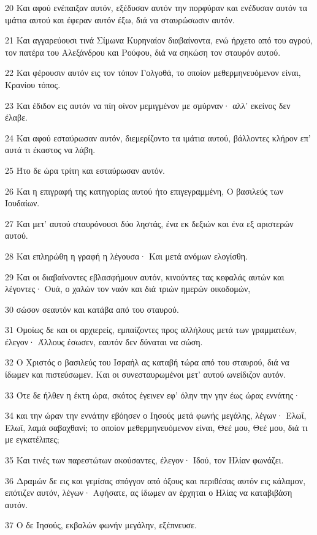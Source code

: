 \par 20 Και αφού ενέπαιξαν αυτόν, εξέδυσαν αυτόν την πορφύραν και ενέδυσαν αυτόν τα ιμάτια αυτού και έφεραν αυτόν έξω, διά να σταυρώσωσιν αυτόν.
\par 21 Και αγγαρεύουσι τινά Σίμωνα Κυρηναίον διαβαίνοντα, ενώ ήρχετο από του αγρού, τον πατέρα του Αλεξάνδρου και Ρούφου, διά να σηκώση τον σταυρόν αυτού.
\par 22 Και φέρουσιν αυτόν εις τον τόπον Γολγοθά, το οποίον μεθερμηνευόμενον είναι, Κρανίου τόπος.
\par 23 Και έδιδον εις αυτόν να πίη οίνον μεμιγμένον με σμύρναν· αλλ' εκείνος δεν έλαβε.
\par 24 Και αφού εσταύρωσαν αυτόν, διεμερίζοντο τα ιμάτια αυτού, βάλλοντες κλήρον επ' αυτά τι έκαστος να λάβη.
\par 25 Ήτο δε ώρα τρίτη και εσταύρωσαν αυτόν.
\par 26 Και η επιγραφή της κατηγορίας αυτού ήτο επιγεγραμμένη, Ο βασιλεύς των Ιουδαίων.
\par 27 Και μετ' αυτού σταυρόνουσι δύο ληστάς, ένα εκ δεξιών και ένα εξ αριστερών αυτού.
\par 28 Και επληρώθη η γραφή η λέγουσα· Και μετά ανόμων ελογίσθη.
\par 29 Και οι διαβαίνοντες εβλασφήμουν αυτόν, κινούντες τας κεφαλάς αυτών και λέγοντες· Ουά, ο χαλών τον ναόν και διά τριών ημερών οικοδομών,
\par 30 σώσον σεαυτόν και κατάβα από του σταυρού.
\par 31 Ομοίως δε και οι αρχιερείς, εμπαίζοντες προς αλλήλους μετά των γραμματέων, έλεγον· Άλλους έσωσεν, εαυτόν δεν δύναται να σώση.
\par 32 Ο Χριστός ο βασιλεύς του Ισραήλ ας καταβή τώρα από του σταυρού, διά να ίδωμεν και πιστεύσωμεν. Και οι συνεσταυρωμένοι μετ' αυτού ωνείδιζον αυτόν.
\par 33 Ότε δε ήλθεν η έκτη ώρα, σκότος έγεινεν εφ' όλην την γην έως ώρας εννάτης·
\par 34 και την ώραν την εννάτην εβόησεν ο Ιησούς μετά φωνής μεγάλης, λέγων· Ελωΐ, Ελωΐ, λαμά σαβαχθανί; το οποίον μεθερμηνευόμενον είναι, Θεέ μου, Θεέ μου, διά τι με εγκατέλιπες;
\par 35 Και τινές των παρεστώτων ακούσαντες, έλεγον· Ιδού, τον Ηλίαν φωνάζει.
\par 36 Δραμών δε εις και γεμίσας σπόγγον από όξους και περιθέσας αυτόν εις κάλαμον, επότιζεν αυτόν, λέγων· Αφήσατε, ας ίδωμεν αν έρχηται ο Ηλίας να καταβιβάση αυτόν.
\par 37 Ο δε Ιησούς, εκβαλών φωνήν μεγάλην, εξέπνευσε.
